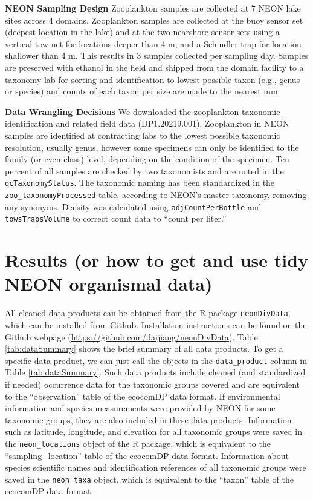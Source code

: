 \documentclass[
  12pt,
]{article}
\begin{document}
\textbf{NEON Sampling Design} Zooplankton samples are collected at 7 NEON lake sites across 4 domains. Zooplankton samples are collected at the buoy sensor set (deepest location in the lake) and at the two nearshore sensor sets using a vertical tow net for locations deeper than 4 m, and a Schindler trap for location shallower than 4 m. This results in 3 samples collected per sampling day. Samples are preserved with ethanol in the field and shipped from the domain facility to a taxonomy lab for sorting and identification to lowest possible taxon (e.g., genus or species) and counts of each taxon per size are made to the nearest mm.

\textbf{Data Wrangling Decisions} We downloaded the zooplankton taxonomic identification and related field data (DP1.20219.001). Zooplankton in NEON samples are identified at contracting labs to the lowest possible taxonomic resolution, usually genus, however some specimens can only be identified to the family (or even class) level, depending on the condition of the specimen. Ten percent of all samples are checked by two taxonomists and are noted in the \texttt{qcTaxonomyStatus}. The taxonomic naming has been standardized in the \texttt{zoo\_taxonomyProcessed} table, according to NEON's master taxonomy, removing any synonyms. Density was calculated using \texttt{adjCountPerBottle} and \texttt{towsTrapsVolume} to correct count data to ``count per liter.''

\hypertarget{results-or-how-to-get-and-use-tidy-neon-organismal-data}{%
\section{Results (or how to get and use tidy NEON organismal data)}\label{results-or-how-to-get-and-use-tidy-neon-organismal-data}}

All cleaned data products can be obtained from the R package \texttt{neonDivData}, which can be installed from Github. Installation instructions can be found on the Github webpage (\url{https://github.com/daijiang/neonDivData}). Table \ref{tab:dataSummary} shows the brief summary of all data products. To get a specific data product, we can just call the objects in the \texttt{data\_product} column in Table \ref{tab:dataSummary}. Such data products include cleaned (and standardized if needed) occurrence data for the taxonomic groups covered and are equivalent to the ``observation'' table of the ecocomDP data format. If environmental information and species measurements were provided by NEON for some taxonomic groups, they are also included in these data products. Information such as latitude, longitude, and elevation for all taxonomic groups were saved in the \texttt{neon\_locations} object of the R package, which is equivalent to the ``sampling\_location'' table of the ecocomDP data format. Information about species scientific names and identification references of all taxonomic groups were saved in the \texttt{neon\_taxa} object, which is equivalent to the ``taxon'' table of the ecocomDP data format.
\end{document}
